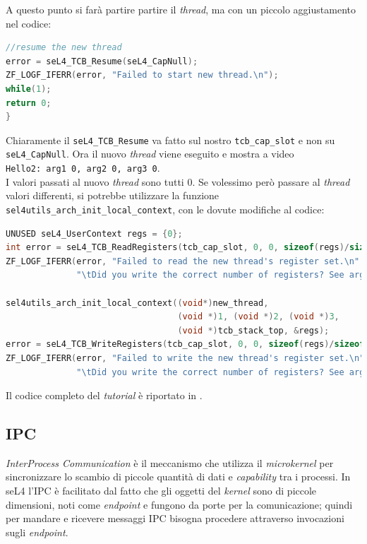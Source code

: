 A questo punto si farà partire partire il \textit{thread}, ma con un piccolo aggiustamento nel codice:
\begin{lstlisting}[language=C++]
//resume the new thread
error = seL4_TCB_Resume(seL4_CapNull);
ZF_LOGF_IFERR(error, "Failed to start new thread.\n");
while(1);
return 0;
}
\end{lstlisting}

Chiaramente il \texttt{seL4\_TCB\_Resume} va fatto sul nostro \texttt{tcb\_cap\_slot} e non su \texttt{seL4\_CapNull}. Ora il nuovo \textit{thread} viene eseguito e mostra a video\\
\texttt{Hello2: arg1 0, arg2 0, arg3 0}.\\
I valori passati al nuovo \textit{thread} sono tutti 0. Se volessimo però passare al \textit{thread} valori differenti, si potrebbe utilizzare la funzione \texttt{sel4utils\_arch\_init\_local\_context}, con le dovute modifiche al codice:
\begin{lstlisting}[language=C++]
UNUSED seL4_UserContext regs = {0};
int error = seL4_TCB_ReadRegisters(tcb_cap_slot, 0, 0, sizeof(regs)/sizeof(seL4_Word), &regs);
ZF_LOGF_IFERR(error, "Failed to read the new thread's register set.\n"
              "\tDid you write the correct number of registers? See arg4.\n");

sel4utils_arch_init_local_context((void*)new_thread,
                                  (void *)1, (void *)2, (void *)3,
                                  (void *)tcb_stack_top, &regs);
error = seL4_TCB_WriteRegisters(tcb_cap_slot, 0, 0, sizeof(regs)/sizeof(seL4_Word), &regs);
ZF_LOGF_IFERR(error, "Failed to write the new thread's register set.\n"
              "\tDid you write the correct number of registers? See arg4.\n");
\end{lstlisting}
Il codice completo del \textit{tutorial} è riportato in \cite{threads}.

\subsection{IPC}
\textit{InterProcess Communication} è il meccanismo che utilizza il \textit{microkernel} per sincronizzare lo scambio di  piccole quantità di dati e \textit{capability} tra i processi. In seL4 l'IPC è facilitato dal fatto che gli oggetti del \textit{kernel} sono di piccole dimensioni, noti come \textit{endpoint} e fungono da porte per la comunicazione; quindi per mandare e ricevere messaggi IPC bisogna procedere attraverso invocazioni sugli \textit{endpoint}.

